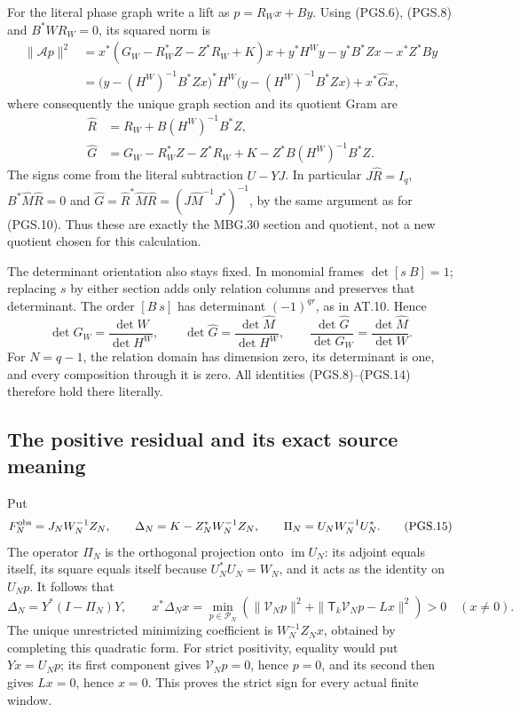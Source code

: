 For the literal phase graph write a lift as \(p=R_Wx+By\).
Using (PGS.6), (PGS.8) and \(B^*WR_W=0\), its squared norm is
\[
\begin{aligned}
 \|\mathcal A p\|^2
  &=x^*(G_W-R_W^*Z-Z^*R_W+K)x
    +y^*H^Wy-y^*B^*Zx-x^*Z^*By\\
  &=\bigl(y-(H^W)^{-1}B^*Zx\bigr)^*H^W
       \bigl(y-(H^W)^{-1}B^*Zx\bigr)
     +x^*\widehat Gx,
\end{aligned}
\tag{PGS.12}\label{eq:pgs-complete-square}
\]
where consequently the unique graph section and its quotient Gram are
\[
\boxed{\begin{aligned}
 \widehat R&=R_W+B(H^W)^{-1}B^*Z,\\
 \widehat G&=G_W-R_W^*Z-Z^*R_W+K
                    -Z^*B(H^W)^{-1}B^*Z.
\end{aligned}}
\tag{PGS.13}\label{eq:pgs-graph-section}
\]
The signs come from the literal subtraction \(U-YJ\). In particular
\(J\widehat R=I_q\),
\(B^*\widehat M\widehat R=0\) and
\(\widehat G=\widehat R^*\widehat M\widehat R
=(J\widehat M^{-1}J^*)^{-1}\), by the same argument as for
(PGS.10). Thus these are exactly the MBG.30 section and quotient,
not a new quotient chosen for this calculation.

The determinant orientation also stays fixed. In monomial frames
\(\det[s\ B]=1\); replacing \(s\) by either section adds only
relation columns and preserves that determinant. The order \([B\ s]\)
has determinant \((-1)^{qr}\), as in AT.10. Hence
\[
 \det G_W=\frac{\det W}{\det H^W},\qquad
 \det\widehat G=\frac{\det\widehat M}{\det H^W},\qquad
 \frac{\det\widehat G}{\det G_W}
      =\frac{\det\widehat M}{\det W}.
\tag{PGS.14}\label{eq:pgs-determinants}
\]
For \(N=q-1\), the relation domain has dimension zero, its
determinant is one, and every composition through it is zero.
All identities (PGS.8)--(PGS.14) therefore hold there literally.

\subsection{The positive residual and its exact source meaning}

Put
\[
 F_N^{\rm obs}=J_NW_N^{-1}Z_N,\qquad
 \Delta_N=K-Z_N^*W_N^{-1}Z_N,\qquad
 \Pi_N=U_NW_N^{-1}U_N^*.
\tag{PGS.15}\label{eq:pgs-residual-data}
\]
The operator \(\Pi_N\) is the orthogonal projection onto
\(\operatorname{im}U_N\): its adjoint equals itself, its square
equals itself because \(U_N^*U_N=W_N\), and it acts as the
identity on \(U_Np\). It follows that
\[
 \Delta_N=Y^*(I-\Pi_N)Y,\qquad
 x^*\Delta_Nx=\min_{p\in\mathcal P_N}
   \left(\|\mathcal V_Np\|^2+
       \|\mathsf T_k\mathcal V_Np-Lx\|^2\right)>0
       \quad(x\ne0).
\tag{PGS.16}\label{eq:pgs-residual-positive}
\]
The unique unrestricted minimizing coefficient is
\(W_N^{-1}Z_Nx\), obtained by completing this quadratic form.
For strict positivity, equality would put \(Yx=U_Np\); its first
component gives \(\mathcal V_Np=0\), hence \(p=0\), and its
second then gives \(Lx=0\), hence \(x=0\). This proves the strict
sign for every actual finite window.

